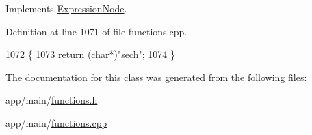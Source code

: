 Implements \hyperlink{classExpressionNode_a42a5e9562b0f645a19dcc83f698069b5}{Expression\+Node}.



Definition at line 1071 of file functions.\+cpp.


\begin{DoxyCode}
1072 \{
1073     \textcolor{keywordflow}{return} (\textcolor{keywordtype}{char}*)\textcolor{stringliteral}{"sech"};
1074 \}
\end{DoxyCode}


The documentation for this class was generated from the following files\+:\begin{DoxyCompactItemize}
\item 
app/main/\hyperlink{functions_8h}{functions.\+h}\item 
app/main/\hyperlink{functions_8cpp}{functions.\+cpp}\end{DoxyCompactItemize}
